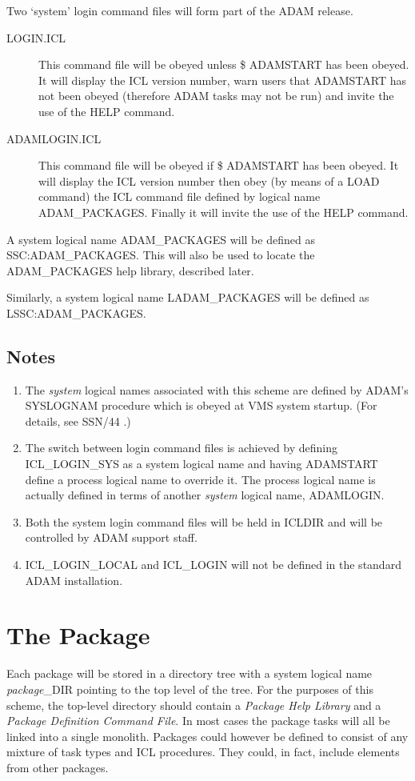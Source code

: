 Two `system' login command files will form part of the ADAM release.
\begin{description}
\item[LOGIN.ICL] This command file will be obeyed unless \$ ADAMSTART has been
obeyed.
It will display the ICL version number, warn users that ADAM\-START has not 
been obeyed (therefore ADAM tasks may not be run) and invite the use of the 
HELP command.
\item[ADAMLOGIN.ICL] This command file will be obeyed if \$ ADAM\-START has been
obeyed.
It will display the ICL version number then
obey (by means of a LOAD command) the ICL command file defined by logical name
ADAM\-\_PACKAGES.
Finally it will invite the use of the HELP command.
\end{description}
A system logical name ADAM\_PACKAGES will be defined as 
SSC:\-ADAM\-\_PACK\-AGES.
This will also be used to locate the ADAM\-\_PACKAGES help library, described
later.

Similarly, a system logical name LADAM\_PACKAGES will be defined as
LSSC:\-ADAM\-\_PACK\-AGES.


\subsection{Notes}
\begin{enumerate}
\item The {\em system} logical names associated with this scheme are defined by
ADAM's SYS\-LOG\-NAM procedure which is obeyed at VMS system startup.
(For details, see SSN/44 \cite{ssn44}.)
\item The switch between login command files is achieved by defining
ICL\-\_LOGIN\-\_SYS as a system logical name and having ADAM\-START define a 
process logical name to override it. The process logical name is actually
defined in terms of another {\em system} logical name, ADAM\-LOGIN.
\item Both the system login command files will be held in ICLDIR and will be
controlled by ADAM support staff.
\item ICL\-\_LOGIN\-\_LOCAL and ICL\-\_LOGIN will not be defined in the
standard ADAM installation.
\end{enumerate}

\section{The Package}
Each package will be stored in a directory tree with a system logical name
{\em package}\_DIR pointing to the top level of the tree.
For the purposes of this scheme, the top-level directory should contain a
{\em Package Help Library} and a {\em Package Definition Command File}.
In most cases the package tasks will all be linked into a single monolith.
Packages could however be defined to consist of any mixture of task types 
and ICL procedures.
They could, in fact, include elements from other packages.

